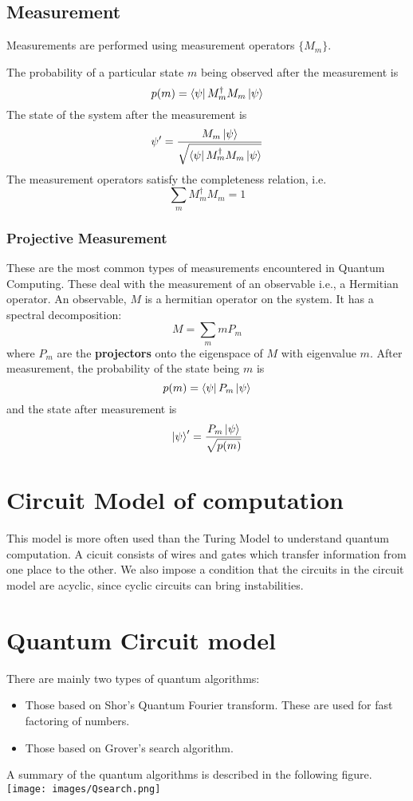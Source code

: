 \documentclass{article}
\begin{document}
\subsection{Measurement}
Measurements are performed using measurement operators $\{ M_m \}$. 
\begin{post}
The probability of a particular state $m$ being observed after the measurement is $$p(m) = \bra{\psi} M_m ^{\dagger} M_m \ket{\psi}$$ The state of the system after the measurement is $$\psi ' = \frac{M_m \ket{\psi}}{\sqrt{\bra{\psi} M_m ^{\dagger} M_m \ket{\psi}}}$$ The measurement operators satisfy the completeness relation, i.e. $$\sum_m M_m ^{\dagger} M_m = 1$$
\end{post}

\subsubsection{Projective Measurement}
These are the most common types of measurements encountered in Quantum Computing. These deal with the measurement of an observable i.e., a Hermitian operator.
An observable, $M$ is a hermitian operator on the system. It has a spectral decomposition:$$M = \sum_m mP_m$$
where $P_m$ are the \textbf{projectors} onto the eigenspace of $M$ with eigenvalue $m$. After measurement, the probability of the state being $m$ is $$p(m) = \bra{\psi} P_m \ket{\psi}$$ and the state after measurement is $$\ket{\psi}' = \frac{P_m \ket{\psi}}{\sqrt{p(m)}}$$

\cleardoublepage
\section{Circuit Model of computation}
This model is more often used than the Turing Model to understand quantum computation. A cicuit consists of wires and gates which transfer information from one place to the other. We also impose a condition that the circuits in the circuit model are acyclic, since cyclic circuits can bring instabilities.

\section{Quantum Circuit model}
There are mainly two types of quantum algorithms:
\begin{itemize}
    \item Those based on Shor's Quantum Fourier transform. These are used for fast factoring of numbers.
    \item Those based on Grover's search algorithm.
    
\end{itemize}
A summary of the quantum algorithms is described in the following figure.
\texttt{[image: images/Qsearch.png]}
\end{document}
